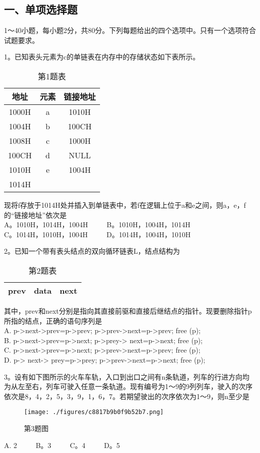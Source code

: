 
\subsection{一、单项选择题}
1～40小题，每小题2分，共80分。下列每题给出的四个选项中。只有一个选项符合试题要求。

1。已知表头元素为c的单链表在内存中的存储状态如下表所示。
\begin{table}[ht]
\centering
\caption{第1题表}\label{tab_CSN16_1}
\begin{tabular}{|c|c|c|}
\hline
地址 & 元素 & 链接地址 \\
\hline
1000H & a & 1010H \\
\hline
1004H & b & 100CH \\
\hline
1008H & c & 1000H \\
\hline
100CH & d & NULL \\
\hline
1010H & e & 1004H \\
\hline
1014H &   &  \\
\hline
\end{tabular}
\end{table}
现将f存放于1014H处并插入到单链表中，若f在逻辑上位于a和e之间，则a，e，f的“链接地址”依次是 \\
A。1010H，1014H，1004H $\qquad$ B。1010H，1004H，1014H \\
C。1014H，1010H，1004H $\qquad$ D。1014H，1004H，1010H

2。已知一个带有表头结点的双向循环链表L，结点结构为 \\
\begin{table}[ht]
\centering
\caption{第2题表}\label{tab_CSN16_2}
\begin{tabular}{|c|c|c|}
\hline
prev & data & next \\
\hline
\end{tabular}
\end{table}
其中，prev和next分别是指向其直接前驱和直接后继结点的指针。现要删除指针p所指的结点，正确的语句序列是 \\
A. p->next->prev=p->prev; p->prev->next=p->prev; free (p); \\
B. p->next->prev=p->next; p->prey-> next=p->next; free (p); \\
C. p->next->prev=p->next; p->prev->next=p->prev; free (p); \\
D. p-> next-> prey=p->prey; p->prev->next=p->next; free (p);

3。设有如下图所示的火车车轨，入口到出口之间有n条轨道，列车的行进方向均为从左至右，列车可驶入任意一条轨道。现有编号为1～9的9列列车，驶入的次序依次是8，4，2，5，3，9，1，6，7。若期望驶出的次序依次为1～9，则n至少是 \\
\begin{figure}[ht]
\centering
\texttt{[image: ./figures/c8817b9b0f9b52b7.png]}
\caption{第3题图} \label{fig_CSN16_1}
\end{figure}
A. 2 $\qquad$ B。3 $\qquad$ C。4 $\qquad$ D。5

